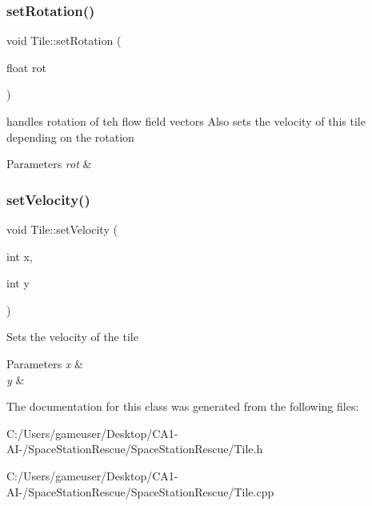 \subsubsection{\texorpdfstring{setRotation()}{setRotation()}}
{\footnotesize\ttfamily void Tile\+::set\+Rotation (\begin{DoxyParamCaption}\item[{float}]{rot }\end{DoxyParamCaption})}



handles rotation of teh flow field vectors Also sets the velocity of this tile depending on the rotation 


\begin{DoxyParams}{Parameters}
{\em rot} & \\
\hline
\end{DoxyParams}
\mbox{\label{class_tile_a0bfaf04d2c485e94225817ee87e88305}} 
\subsubsection{\texorpdfstring{setVelocity()}{setVelocity()}}
{\footnotesize\ttfamily void Tile\+::set\+Velocity (\begin{DoxyParamCaption}\item[{int}]{x,  }\item[{int}]{y }\end{DoxyParamCaption})}



Sets the velocity of the tile 


\begin{DoxyParams}{Parameters}
{\em x} & \\
\hline
{\em y} & \\
\hline
\end{DoxyParams}


The documentation for this class was generated from the following files\+:\begin{DoxyCompactItemize}
\item 
C\+:/\+Users/gameuser/\+Desktop/\+C\+A1-\/\+A\+I-\//\+Space\+Station\+Rescue/\+Space\+Station\+Rescue/Tile.\+h\item 
C\+:/\+Users/gameuser/\+Desktop/\+C\+A1-\/\+A\+I-\//\+Space\+Station\+Rescue/\+Space\+Station\+Rescue/Tile.\+cpp\end{DoxyCompactItemize}
